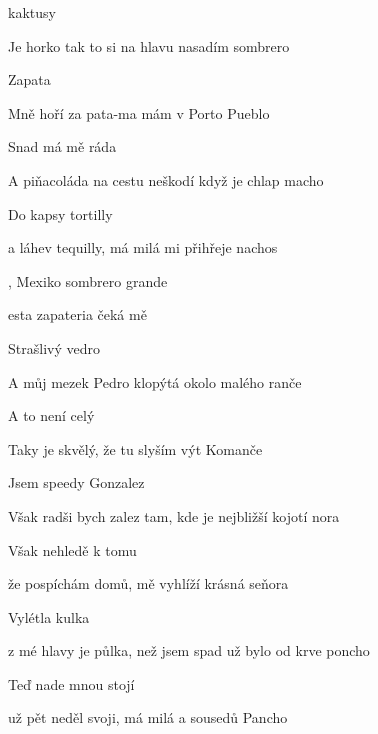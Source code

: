 

\zs
{} kaktusy

Je horko tak to si na hlavu nasadím sombrero 

 Zapata

Mně hoří za pata-ma mám v Porto Pueblo 
\ks

\zs
Snad má mě ráda

A piňacoláda na cestu neškodí když je chlap macho

Do kapsy tortilly

a láhev tequilly, má milá mi přihřeje nachos
\ks

\zr
{}, Mexiko sombrero grande 

 esta zapateria čeká mě 
\kr

\zs
Strašlivý vedro

A můj mezek Pedro klopýtá okolo malého ranče

A to není celý

Taky je skvělý, že tu slyším výt Komanče
\ks

\zs
Jsem speedy Gonzalez

Však radši bych zalez tam, kde je nejbližší kojotí nora

Však nehledě k tomu

že pospíchám domů, mě vyhlíží krásná seňora
\ks

\zr  \kr

\zs
Vylétla kulka

z mé hlavy je půlka, než jsem spad už bylo od krve poncho

Teď nade mnou stojí

už pět neděl svoji, má milá a sousedů Pancho
\ks

\zr  \kr

\kp





